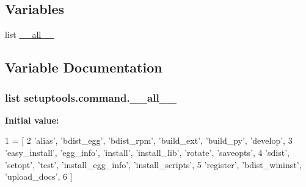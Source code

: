 \subsection*{Variables}
\begin{DoxyCompactItemize}
\item 
list \hyperlink{namespacesetuptools_1_1command_a9849f1fc79c2a58181a879d859f1a1d3}{\+\_\+\+\_\+all\+\_\+\+\_\+}
\end{DoxyCompactItemize}


\subsection{Variable Documentation}
\hypertarget{namespacesetuptools_1_1command_a9849f1fc79c2a58181a879d859f1a1d3}{}
\subsubsection[{\+\_\+\+\_\+all\+\_\+\+\_\+}]{\setlength{\rightskip}{0pt plus 5cm}list setuptools.\+command.\+\_\+\+\_\+all\+\_\+\+\_\+}\label{namespacesetuptools_1_1command_a9849f1fc79c2a58181a879d859f1a1d3}
{\bfseries Initial value\+:}
\begin{DoxyCode}
1 = [
2     \textcolor{stringliteral}{'alias'}, \textcolor{stringliteral}{'bdist\_egg'}, \textcolor{stringliteral}{'bdist\_rpm'}, \textcolor{stringliteral}{'build\_ext'}, \textcolor{stringliteral}{'build\_py'}, \textcolor{stringliteral}{'develop'},
3     \textcolor{stringliteral}{'easy\_install'}, \textcolor{stringliteral}{'egg\_info'}, \textcolor{stringliteral}{'install'}, \textcolor{stringliteral}{'install\_lib'}, \textcolor{stringliteral}{'rotate'}, \textcolor{stringliteral}{'saveopts'},
4     \textcolor{stringliteral}{'sdist'}, \textcolor{stringliteral}{'setopt'}, \textcolor{stringliteral}{'test'}, \textcolor{stringliteral}{'install\_egg\_info'}, \textcolor{stringliteral}{'install\_scripts'},
5     \textcolor{stringliteral}{'register'}, \textcolor{stringliteral}{'bdist\_wininst'}, \textcolor{stringliteral}{'upload\_docs'},
6 ]
\end{DoxyCode}
